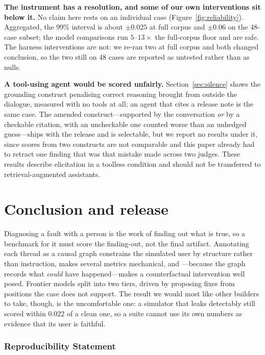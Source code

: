\documentclass{article} %
\begin{document}
\textbf{The instrument has a resolution, and some of our own
interventions sit below it.} No claim here rests on an individual case
(Figure~\ref{fig:reliability}). Aggregated, the 99\% interval is about
$\pm0.025$ at full corpus and $\pm0.06$ on the 48-case subset; the model
comparisons run $5$--$13\times$ the full-corpus floor and are safe. The
harness interventions are not: we re-ran two at full corpus and both
changed conclusion, so the two still on 48 cases are reported as untested
rather than as nulls.

\textbf{A tool-using agent would be scored unfairly.}
Section~\ref{sec:silence} shows the grounding construct penalising correct
reasoning brought from outside the dialogue, measured with no tools at
all; an agent that cites a release note is the same case. The amended
construct---supported by the conversation \emph{or} by a checkable
citation, with an uncheckable one counted worse than an unhedged
guess---ships with the release and is selectable, but we report no
results under it, since scores from two constructs are not comparable and
this paper already had to retract one finding that was that mistake made
across two judges. These results describe elicitation in a
toolless condition and should not be transferred to retrieval-augmented
assistants.

\section{Conclusion and release}

Diagnosing a fault with a person is the work of finding out what is true,
so a benchmark for it must score the finding-out, not the final artifact.
Annotating each thread as a causal graph constrains the simulated user by
structure rather than instruction, makes several metrics mechanical, and
---because the graph records what \emph{could} have happened---makes a
counterfactual intervention well posed. Frontier models split into two
tiers, driven by proposing fixes from positions the case does not
support. The result we would most like other builders to take, though, is
the uncomfortable one: a simulator that leaks detectably still scored
within 0.022 of a clean one, so a suite cannot use its own numbers as
evidence that its user is faithful.

\subsubsection*{Reproducibility Statement}
\end{document}
